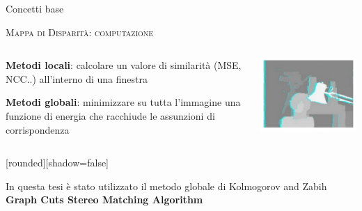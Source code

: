 \documentclass{beamer}
\begin{document}
\begin{section}{Concetti base}


\begin{frame}[t]{\textsc{Mappa di Disparit\`{a}: computazione}}
\begin{columns}
\begin{column}{5cm}
\vspace{1em}
\begin{itemize}
\item \small{\textbf{Metodi locali}: calcolare un valore di similarit\`{a} (MSE, NCC..) all'interno di una finestra  
\item \textbf{Metodi globali}: minimizzare su tutta l'immagine una funzione di energia che racchiude le assunzioni di corrispondenza
}
\end{itemize}
\end{column}
\begin{column}{5.5cm}
\vspace{1.5em}
\centering
\includegraphics[width=1\linewidth]{./img/graph.png}
\end{column}
\end{columns}
\vspace{-1em}
\begin{center}
	[rounded][shadow=false]
\begin{block}{}
\center \small{In questa tesi \`{e} stato utilizzato il metodo globale  di Kolmogorov and Zabih \textbf{Graph Cuts Stereo Matching Algorithm}}
\end{block}
\end{center}
\end{frame}



\end{section}
\end{document}
